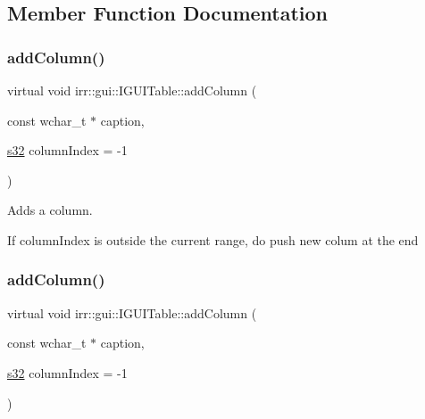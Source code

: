 \subsection{Member Function Documentation}
\mbox{\label{classirr_1_1gui_1_1IGUITable_a6ae4360ca563f13a178e69653187e7f6}} 
\subsubsection{\texorpdfstring{add\+Column()}{addColumn()}\hspace{0.1cm}{\footnotesize\ttfamily [1/2]}}
{\footnotesize\ttfamily virtual void irr\+::gui\+::\+I\+G\+U\+I\+Table\+::add\+Column (\begin{DoxyParamCaption}\item[{const wchar\+\_\+t $\ast$}]{caption,  }\item[{\hyperlink{namespaceirr_ac66849b7a6ed16e30ebede579f9b47c6}{s32}}]{column\+Index = {\ttfamily -\/1} }\end{DoxyParamCaption})\hspace{0.3cm}{\ttfamily [pure virtual]}}



Adds a column. 

If column\+Index is outside the current range, do push new colum at the end \mbox{\label{classirr_1_1gui_1_1IGUITable_a6ae4360ca563f13a178e69653187e7f6}} 
\subsubsection{\texorpdfstring{add\+Column()}{addColumn()}\hspace{0.1cm}{\footnotesize\ttfamily [2/2]}}
{\footnotesize\ttfamily virtual void irr\+::gui\+::\+I\+G\+U\+I\+Table\+::add\+Column (\begin{DoxyParamCaption}\item[{const wchar\+\_\+t $\ast$}]{caption,  }\item[{\hyperlink{namespaceirr_ac66849b7a6ed16e30ebede579f9b47c6}{s32}}]{column\+Index = {\ttfamily -\/1} }\end{DoxyParamCaption})\hspace{0.3cm}{\ttfamily [pure virtual]}}



